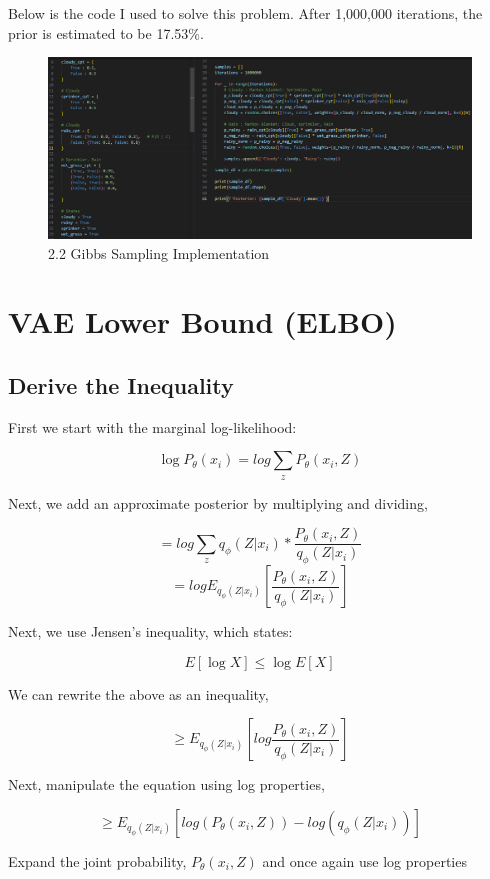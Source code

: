 \documentclass{article}
\begin{document}
Below is the code I used to solve this problem. After 1,000,000 iterations, the prior is estimated to be 17.53\%.

\begin{figure}[H]
    \centering
    \includegraphics[width=1\linewidth]{Q2 Code.png}
    \caption{2.2 Gibbs Sampling Implementation}
    \label{fig:enter-label}
\end{figure}

\section{VAE Lower Bound (ELBO)}
\subsection{Derive the Inequality}

First we start with the marginal log-likelihood:

\[\log P_\theta (x_i) = log \sum_z  P_\theta(x_i, Z) \]

Next, we add an approximate posterior by multiplying and dividing,

\[ = log \sum_z   q_\phi (Z | x_i) *\frac{P_\theta(x_i, Z) }{q_\phi (Z | x_i)} \]
\[ = log E_{q_\phi (Z | x_i)}[\frac{P_\theta(x_i, Z) }{q_\phi (Z | x_i)}]\]

Next, we use Jensen's inequality, which states:

\[E[\log X] \leq \log E[X]\]

We can rewrite the above as an inequality,

\[ \geq E_{q_\phi (Z | x_i)} [log\frac{P_\theta(x_i, Z) }{q_\phi (Z | x_i)}]\]

Next, manipulate the equation using log properties,

\[ \geq E_{q_\phi (Z | x_i)} [log (P_\theta(x_i, Z)) - log (q_\phi (Z | x_i))]\]

Expand the joint probability, $P_\theta(x_i, Z)$ and once again use log properties
\end{document}
